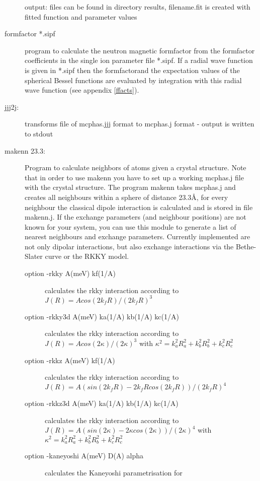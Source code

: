 \begin{description}
 output:  files can be found in directory results, filename.fit is created with fitted function and parameter values
\item[\prg formfactor\index{formfactor} *.sipf] program to calculate the neutron magnetic formfactor
from the formfactor coefficients in the single ion parameter file *.sipf. If a radial wave function is given in *.sipf
then the formfactorand the expectation values of the spherical Bessel functions  are evaluated by integration
with this radial wave function (see appendix \ref{ffacts}).
\item [\prg jjj2j:] transforms file of {\prg mcphas.jjj} format to {\prg %
mcphas.j} format
- output is written to stdout

\item[\prg makenn 23.3:] Program to calculate neighbors of atoms given a crystal structure.
Note that in order to use {\prg makenn} you have to set up a 
working {\prg mcphas.j} file with the crystal structure. 
The program {\prg makenn} takes {\prg mcphas.j} and
creates all neighbours within a sphere of distance 23.3\AA, for every neighbour the classical
dipole interaction is calculated and is stored in file {\prg makenn.j}. If the exchange %
parameters 
(and neighbour positions) are not known for your system, you can use this module 
to generate a list of nearest neighbours and exchange parameters. Currently implemented 
 are not only dipolar interactions, but also exchange interactions via the Bethe-Slater 
curve or the RKKY model. 
\begin{description}
\item[option {\prg -rkky A(meV) kf(1/A)}] calculates the rkky interaction according to $J(R)=A %
cos(2 k_f R)/(2 k_f R)^3$
\item[option {\prg -rkky3d A(meV) ka(1/A) kb(1/A) kc(1/A)}] calculates the rkky interaction %
according to $J(R)=A cos(2 \kappa)/(2 \kappa)^3$ with $\kappa^2=k_a^2 R_a^2 + k_b^2 R_b^2 + %
k_c^2 R_c^2$
\item[option {\prg -rkkz A(meV) kf(1/A)}] calculates the rkky interaction according to $J(R)=A %
(sin(2 k_f R)- 2 k_f R cos(2 k_f R))/(2 k_f R)^4$
\item[option {\prg -rkkz3d A(meV) ka(1/A) kb(1/A) kc(1/A)}] calculates the rkky interaction %
according to $J(R)=A (sin(2 \kappa)- 2 \kappa cos(2 \kappa))/(2 \kappa)^4$ with $\kappa^2=k_a^2 %
R_a^2 + k_b^2 R_b^2 + k_c^2 R_c^2$
\item[option {\prg -kaneyoshi A(meV) D(A) alpha}] calculates the Kaneyoshi parametrisation for %

\end{description}
\end{description}
